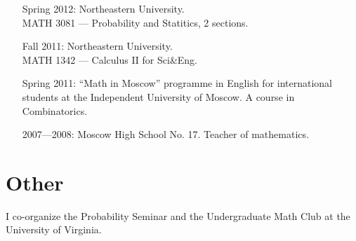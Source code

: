 \documentclass[letterpaper,11pt]{article}
\begin{document}
\begin{itemize}
  \item[Spring 2012:] 
  Northeastern University. \\
  MATH 3081 --- 
  Probability and Statitics, 2 sections.
  \item[Fall 2011:]
  Northeastern University.\\
  MATH 1342 --- 
  Calculus II for Sci\&Eng.
  \item[Spring 2011:]
  ``Math in Moscow'' programme in English for international students at the Independent University of Moscow. A course in Combinatorics.

  \item[2007---2008:]
  Moscow High School No. 17.
  Teacher of mathematics.
\end{itemize}

\section*{Other}

I co-organize the
Probability Seminar and the Undergraduate Math Club
at the University of Virginia.





\end{document}
